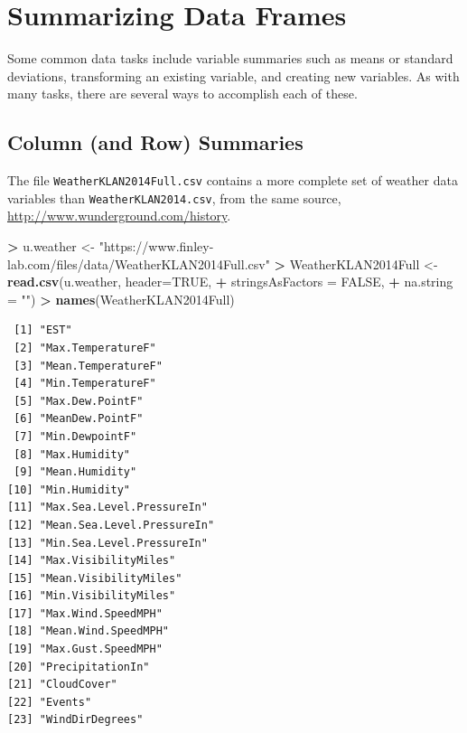 \documentclass[
]{krantz}
\makeatletter
\newenvironment{Shaded}{\begin{snugshade}}{\end{snugshade}}
\newcommand{\DataTypeTok}[1]{\textcolor[rgb]{0.27,0.27,0.27}{#1}}
\newcommand{\KeywordTok}[1]{\textcolor[rgb]{0.27,0.27,0.27}{\textbf{#1}}}
\newcommand{\NormalTok}[1]{#1}
\newcommand{\OperatorTok}[1]{\textcolor[rgb]{0.43,0.43,0.43}{\textbf{#1}}}
\newcommand{\OtherTok}[1]{\textcolor[rgb]{0.37,0.37,0.37}{#1}}
\newcommand{\StringTok}[1]{\textcolor[rgb]{0.5,0.5,0.5}{#1}}
\newenvironment{kframe}{%
\medskip{}
\setlength{\fboxsep}{.8em}
 \def\at@end@of@kframe{}%
 \ifinner\ifhmode%
  \def\at@end@of@kframe{\end{minipage}}%
  \begin{minipage}{\columnwidth}%
 \fi\fi%
 \def\FrameCommand##1{\hskip\@totalleftmargin \hskip-\fboxsep
 \colorbox{shadecolor}{##1}\hskip-\fboxsep
     \hskip-\linewidth \hskip-\@totalleftmargin \hskip\columnwidth}%
 \MakeFramed {\advance\hsize-\width
   \@totalleftmargin\z@ \linewidth\hsize
   \@setminipage}}%
 {\par\unskip\endMakeFramed%
 \at@end@of@kframe}
\renewenvironment{Shaded}{\begin{kframe}}{\end{kframe}}
\makeatother
\begin{document}
\hypertarget{summarizing-data-frames}{%
\section{Summarizing Data Frames}\label{summarizing-data-frames}}

Some common data tasks include variable summaries such as means or standard deviations, transforming an existing variable, and creating new variables. As with many tasks, there are several ways to accomplish each of these.

\hypertarget{column-and-row-summaries}{%
\subsection{Column (and Row) Summaries}\label{column-and-row-summaries}}

The file \texttt{WeatherKLAN2014Full.csv} contains a more complete set of weather data variables than \texttt{WeatherKLAN2014.csv}, from the same source, \url{http://www.wunderground.com/history}.

\begin{Shaded}
\begin{Highlighting}[]
\OperatorTok{\textgreater{}}\StringTok{ }\NormalTok{u.weather \textless{}{-}}\StringTok{ "https://www.finley{-}lab.com/files/data/WeatherKLAN2014Full.csv"}
\OperatorTok{\textgreater{}}\StringTok{ }\NormalTok{WeatherKLAN2014Full \textless{}{-}}\StringTok{ }\KeywordTok{read.csv}\NormalTok{(u.weather, }\DataTypeTok{header=}\OtherTok{TRUE}\NormalTok{, }
\OperatorTok{+}\StringTok{                                }\DataTypeTok{stringsAsFactors =} \OtherTok{FALSE}\NormalTok{, }
\OperatorTok{+}\StringTok{                                }\DataTypeTok{na.string =} \StringTok{""}\NormalTok{)}
\OperatorTok{\textgreater{}}\StringTok{ }\KeywordTok{names}\NormalTok{(WeatherKLAN2014Full)}
\end{Highlighting}
\end{Shaded}

\begin{verbatim}
 [1] "EST"                      
 [2] "Max.TemperatureF"         
 [3] "Mean.TemperatureF"        
 [4] "Min.TemperatureF"         
 [5] "Max.Dew.PointF"           
 [6] "MeanDew.PointF"           
 [7] "Min.DewpointF"            
 [8] "Max.Humidity"             
 [9] "Mean.Humidity"            
[10] "Min.Humidity"             
[11] "Max.Sea.Level.PressureIn" 
[12] "Mean.Sea.Level.PressureIn"
[13] "Min.Sea.Level.PressureIn" 
[14] "Max.VisibilityMiles"      
[15] "Mean.VisibilityMiles"     
[16] "Min.VisibilityMiles"      
[17] "Max.Wind.SpeedMPH"        
[18] "Mean.Wind.SpeedMPH"       
[19] "Max.Gust.SpeedMPH"        
[20] "PrecipitationIn"          
[21] "CloudCover"               
[22] "Events"                   
[23] "WindDirDegrees"           
\end{verbatim}
\end{document}
